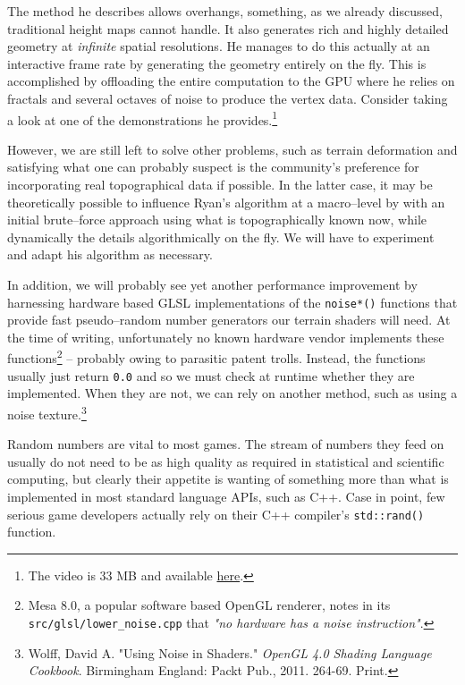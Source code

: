 The method he describes allows overhangs, something, as we already discussed, traditional height maps cannot handle. It also generates rich and highly detailed geometry at {\it infinite} spatial resolutions. He manages to do this actually at an interactive frame rate by generating the geometry entirely on the fly. This is accomplished by offloading the entire computation to the GPU where he relies on fractals and several octaves of noise to produce the vertex data. Consider taking a look at one of the demonstrations he provides.\footnote{The video is 33 MB and available \href{http://www.geisswerks.com/gpugems3ch/MVI_7867.avi}{here}.}

However, we are still left to solve other problems, such as terrain deformation and satisfying what one can probably suspect is the community's preference for incorporating real topographical data if possible. In the latter case, it may be theoretically possible to influence Ryan's algorithm at a macro--level by  with an initial brute--force approach using what is topographically known now, while dynamically  the details algorithmically on the fly. We will have to experiment and adapt his algorithm as necessary.

In addition, we will probably see yet another performance improvement by harnessing hardware based GLSL implementations of the {\tt noise*()} functions that provide fast pseudo--random number generators our terrain shaders will need. At the time of writing, unfortunately no known hardware vendor implements these functions\footnote{Mesa 8.0, a popular software based OpenGL renderer, notes in its {\tt src/glsl/lower_noise.cpp} that {\it "no hardware has a noise instruction"}.} -- probably owing to parasitic patent trolls. Instead, the functions usually just return {\tt 0.0} and so we must check at runtime whether they are implemented. When they are not, we can rely on another method, such as using a noise texture.\footnote{Wolff, David A. "Using Noise in Shaders." {\it OpenGL 4.0 Shading Language Cookbook}. Birmingham England: Packt Pub., 2011. 264-69. Print.}

Random numbers are vital to most games. The stream of numbers they feed on usually do not need to be as high quality as required in statistical and scientific computing, but clearly their appetite is wanting of something more than what is implemented in most standard language APIs, such as C++. Case in point, few serious game developers actually rely on their C++ compiler's {\tt std::rand()} function.

